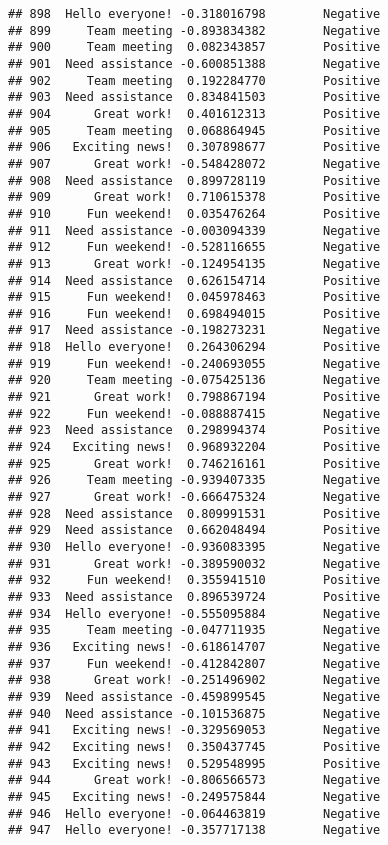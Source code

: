 \documentclass[
]{article}
\begin{document}
\begin{verbatim}
## 898  Hello everyone! -0.318016798        Negative
## 899     Team meeting -0.893834382        Negative
## 900     Team meeting  0.082343857        Positive
## 901  Need assistance -0.600851388        Negative
## 902     Team meeting  0.192284770        Positive
## 903  Need assistance  0.834841503        Positive
## 904      Great work!  0.401612313        Positive
## 905     Team meeting  0.068864945        Positive
## 906   Exciting news!  0.307898677        Positive
## 907      Great work! -0.548428072        Negative
## 908  Need assistance  0.899728119        Positive
## 909      Great work!  0.710615378        Positive
## 910     Fun weekend!  0.035476264        Positive
## 911  Need assistance -0.003094339        Negative
## 912     Fun weekend! -0.528116655        Negative
## 913      Great work! -0.124954135        Negative
## 914  Need assistance  0.626154714        Positive
## 915     Fun weekend!  0.045978463        Positive
## 916     Fun weekend!  0.698494015        Positive
## 917  Need assistance -0.198273231        Negative
## 918  Hello everyone!  0.264306294        Positive
## 919     Fun weekend! -0.240693055        Negative
## 920     Team meeting -0.075425136        Negative
## 921      Great work!  0.798867194        Positive
## 922     Fun weekend! -0.088887415        Negative
## 923  Need assistance  0.298994374        Positive
## 924   Exciting news!  0.968932204        Positive
## 925      Great work!  0.746216161        Positive
## 926     Team meeting -0.939407335        Negative
## 927      Great work! -0.666475324        Negative
## 928  Need assistance  0.809991531        Positive
## 929  Need assistance  0.662048494        Positive
## 930  Hello everyone! -0.936083395        Negative
## 931      Great work! -0.389590032        Negative
## 932     Fun weekend!  0.355941510        Positive
## 933  Need assistance  0.896539724        Positive
## 934  Hello everyone! -0.555095884        Negative
## 935     Team meeting -0.047711935        Negative
## 936   Exciting news! -0.618614707        Negative
## 937     Fun weekend! -0.412842807        Negative
## 938      Great work! -0.251496902        Negative
## 939  Need assistance -0.459899545        Negative
## 940  Need assistance -0.101536875        Negative
## 941   Exciting news! -0.329569053        Negative
## 942   Exciting news!  0.350437745        Positive
## 943   Exciting news!  0.529548995        Positive
## 944      Great work! -0.806566573        Negative
## 945   Exciting news! -0.249575844        Negative
## 946  Hello everyone! -0.064463819        Negative
## 947  Hello everyone! -0.357717138        Negative

\end{verbatim}
\end{document}
